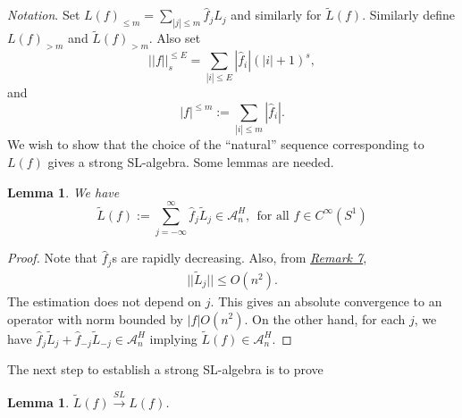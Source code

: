 \documentclass[twoside,11pt,titlepage]{amsart}
\renewcommand{\=}[1]{\stackrel{#1}{=}} %
\newtheorem{lem}[thm]{Lemma}
\theoremstyle{definition}
\theoremstyle{remark}
\begin{document}
\textit{Notation}. Set $L(f)_{\le m}=\sum_{|j| \le m} \hat{f}_jL_j$ and similarly for $\widetilde{L}(f)$. Similarly define $L(f)_{> m}$ and $\widetilde{L}(f)_{> m}$. Also set
$$||f||_{s}^{\le E}=\sum_{|i|\le E} |\hat{f}_i|(|i|+1)^{s},$$
and 
$$|f|^{\le m}:=\sum_{|i| \le m}|\hat{f}_i|.$$
We wish to show that the choice of the ``natural'' sequence corresponding to $L(f)$ gives a strong SL-algebra. Some lemmas are needed.
\begin{lem}\label{lem4.4}
We have
$$\widetilde{L}(f):=\sum_{j=-\infty}^{\infty} \hat{f}_j\widetilde{L}_j \in \mathcal{A}_n^H, \ \ \text{for all } f \in C^\infty(S^1)$$
\end{lem}
\begin{proof}
Note that $\hat{f}_j$s are rapidly decreasing. Also, from \hyperref[rmk7]{\textit{Remark 7}},
\begin{align}\label{eq1}
||\widetilde{L}_j|| \le O(n^2).
\end{align}
The estimation does not depend on $j$. This gives an absolute convergence to an operator with norm bounded by $|f|O(n^2)$. On the other hand, for each $j$, we have $\hat{f}_j\widetilde{L}_j+\hat{f}_{-j}\widetilde{L}_{-j} \in \mathcal{A}_n^H$ implying $\widetilde{L}(f) \in \mathcal{A}_n^H$.
\end{proof}
The next step to establish a strong SL-algebra is to prove
\begin{lem}\label{lem4.5}
$\widetilde{L}(f) \xrightarrow{SL} L(f)$.
\end{lem}
\end{document}
